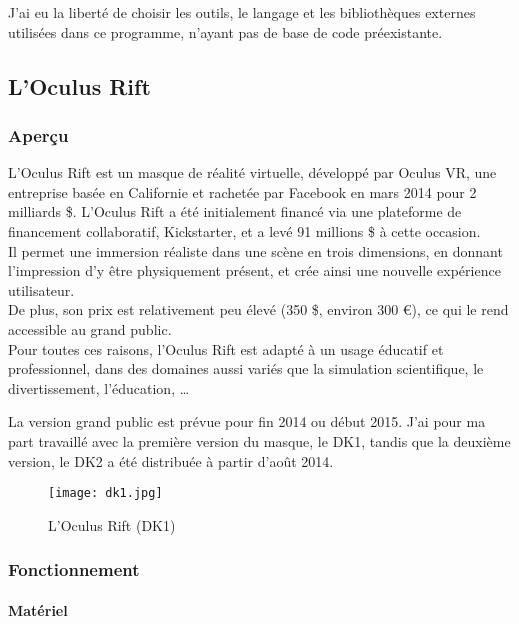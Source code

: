 \documentclass[a4paper,french,12pt]{article}
\begin{document}
		J'ai eu la liberté de choisir les outils, le langage et les bibliothèques  externes utilisées dans ce programme,
		n'ayant pas de base de code préexistante.


	\subsection{L'Oculus Rift}

		\subsubsection{Aperçu}
		  L'Oculus Rift est un masque de réalité virtuelle, développé par Oculus VR, une entreprise
		  basée en Californie et rachetée par Facebook en mars 2014 pour  2 milliards \$.
		  L'Oculus Rift a été initialement financé via une plateforme de financement collaboratif, Kickstarter,
		  et a levé 91 millions \$ à cette occasion. \\
		  Il permet une immersion  réaliste dans une scène en trois dimensions, en donnant l'impression d'y être physiquement
		  présent, et crée ainsi une nouvelle expérience
		  utilisateur. \\
		  De plus, son prix est relativement peu élevé (350 \$, environ 300 \euro), ce qui le rend accessible au grand public. \\
		  Pour toutes ces raisons, l'Oculus Rift est adapté à un usage éducatif et professionnel, dans des domaines aussi variés
		  que la simulation scientifique, le divertissement, l'éducation, \ldots

		  La version grand public est prévue pour fin 2014 ou début 2015. J'ai pour ma part travaillé avec la première
		  version du masque, le DK1, tandis que la deuxième version, le DK2 a été distribuée à partir d'août 2014.
		  \FloatBarrier
		  \begin{figure}[h!]
		    \centering
		      \texttt{[image: dk1.jpg]}
		    \caption{L'Oculus Rift (DK1)}
		  \end{figure}
		  \FloatBarrier
		  \subsubsection{Fonctionnement}

			\paragraph{Matériel} ~\\
\end{document}
